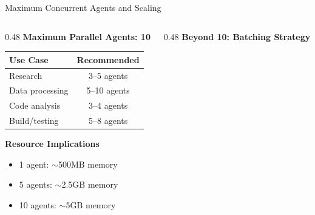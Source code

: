 \documentclass[aspectratio=169,11pt]{beamer}
\begin{document}
\begin{frame}{Maximum Concurrent Agents and Scaling}
    \begin{columns}[T]
        \begin{column}{0.48\textwidth}
            \textbf{Maximum Parallel Agents: 10}

            \vspace{0.2cm}
            \begin{tabular}{lc}
                \toprule
                \textbf{Use Case} & \textbf{Recommended} \\
                \midrule
                Research & 3--5 agents \\
                Data processing & 5--10 agents \\
                Code analysis & 3--4 agents \\
                Build/testing & 5--8 agents \\
                \bottomrule
            \end{tabular}

            \vspace{0.3cm}
            \textbf{Resource Implications}
            \begin{itemize}
                \footnotesize
                \item 1 agent: $\sim$500MB memory
                \item 5 agents: $\sim$2.5GB memory
                \item 10 agents: $\sim$5GB memory
            \end{itemize}
        \end{column}
        \begin{column}{0.48\textwidth}
            \textbf{Beyond 10: Batching Strategy}

\end{column}
\end{columns}
\end{frame}
\end{document}
